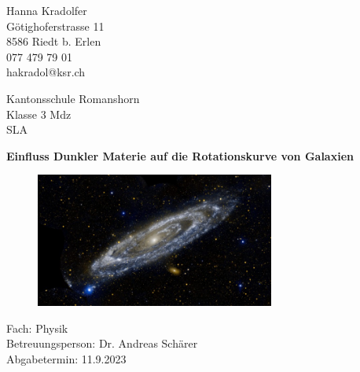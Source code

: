 
\begin{titlepage}
	\clearpage\thispagestyle{empty}	
	
	\begin{minipage}[t]{\textwidth}
		\begin{minipage}[t]{0.5\textwidth}
			Hanna Kradolfer\\
			Götighoferstrasse 11\\
			8586 Riedt b. Erlen\\
			077 479 79 01\\
			hakradol@ksr.ch
		\end{minipage}
		\begin{minipage}[t]{0.5\textwidth}
			\begin{flushright}
				Kantonsschule Romanshorn\\
				Klasse 3 Mdz\\
				SLA
			\end{flushright}
		\end{minipage}
	\end{minipage}
	
	\vspace{3.5cm}
	
	{
		\centering
		\Huge\bfseries Einfluss Dunkler Materie auf die Rotationskurve von Galaxien\par
		\vspace{1.5cm}	
		\begin{figure}[h]
			\centering
			\includegraphics[width=0.7\textwidth]{figures/galaxy.jpg} %
		\end{figure}
	}
	 
	\vspace{5.1cm}	
	\noindent
	Fach: Physik \noindent\\
	Betreuungsperson: Dr. Andreas Schärer\\
	Abgabetermin: 11.9.2023
	
\end{titlepage}
